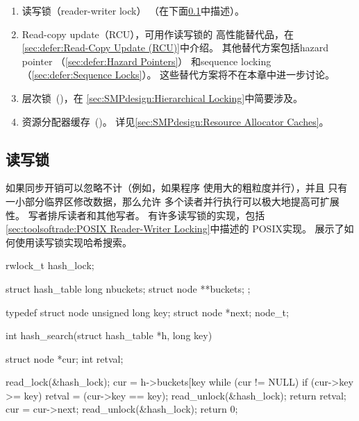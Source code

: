 \begin{enumerate}
\item	读写锁（reader-writer lock）
	（在下面\cref{sec:SMPdesign:Reader/Writer Locking}中描述）。
\item	Read-copy update（RCU），可用作读写锁的
	高性能替代品，在
	\cref{sec:defer:Read-Copy Update (RCU)}中介绍。
	其他替代方案包括hazard pointer
	（\cref{sec:defer:Hazard Pointers}）
	和sequence locking（\cref{sec:defer:Sequence Locks}）。
	这些替代方案将不在本章中进一步讨论。
\item   层次锁~(\cite{McKenney95b})，在
	\cref{sec:SMPdesign:Hierarchical Locking}中简要涉及。
\item	资源分配器缓存~(\cite{McKenney95b,McKenney93})。
	详见\cref{sec:SMPdesign:Resource Allocator Caches}。
\end{enumerate}

\subsection{读写锁}
\label{sec:SMPdesign:Reader/Writer Locking}

如果同步开销可以忽略不计（例如，如果程序
使用大的粗粒度并行），并且
只有一小部分临界区修改数据，那么允许
多个读者并行执行可以极大地提高可扩展性。
写者排斥读者和其他写者。
有许多读写锁的实现，包括
\cref{sec:toolsoftrade:POSIX Reader-Writer Locking}中描述的
POSIX实现。
展示了如何使用读写锁实现哈希搜索。

\begin{listing}
\begin{VerbatimL}[commandchars=\\\@\$]
rwlock_t hash_lock;

struct hash_table
{
	long nbuckets;
	struct node **buckets;
};

typedef struct node {
	unsigned long key;
	struct node *next;
} node_t;

int hash_search(struct hash_table *h, long key)
{
	struct node *cur;
	int retval;

	read_lock(&hash_lock);
	cur = h->buckets[key %
	while (cur != NULL) {
		if (cur->key >= key) {
			retval = (cur->key == key);
			read_unlock(&hash_lock);
			return retval;
		}
		cur = cur->next;
	}
	read_unlock(&hash_lock);
	return 0;
}
\end{VerbatimL}
\caption{读写锁哈希表搜索}
\label{lst:SMPdesign:Reader-Writer-Locking Hash Table Search}
\end{listing}

